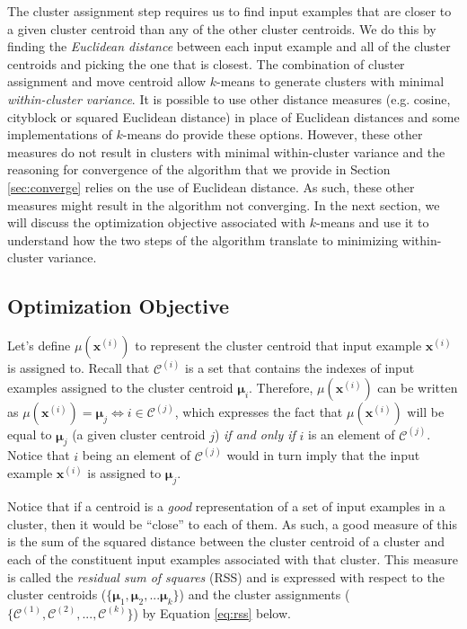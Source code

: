 The cluster assignment step requires us to find input examples that are closer to a given cluster centroid than any of the other cluster centroids. We do this by finding the \emph{Euclidean distance} between each input example and all of the cluster centroids and picking the one that is closest. The combination of cluster assignment and move centroid allow $k$-means to generate clusters with minimal \emph{within-cluster variance}. It is possible to use other distance measures (e.g. cosine, cityblock or squared Euclidean distance) in place of Euclidean distances and some implementations of $k$-means 
do provide these options. However, these other measures do not result in clusters with minimal within-cluster variance and the reasoning for convergence of the algorithm that we provide in Section \ref{sec:converge} relies on the use of Euclidean distance. As such, these other measures might result in the algorithm not converging.
In the next section, we will discuss the optimization objective associated with $k$-means and use it to understand how the two steps of the algorithm translate to minimizing within-cluster variance. 

\subsection{Optimization Objective}
\label{section:optimization-objective}

Let's define $\mu(\mathbf{x}^{(i)})$ to represent the cluster centroid that input example $\mathbf{x}^{(i)}$ is assigned to. Recall that $\mathcal{C}^{(i)}$ is a set that contains the indexes of input examples assigned to the cluster centroid $\boldsymbol{\mu}_i$. Therefore, $\mu(\mathbf{x}^{(i)})$ can be written as $\mu(\mathbf{x}^{(i)}) = \boldsymbol{\mu}_j \iff i \in \mathcal{C}^{(j)}$, which expresses the fact that $\mu(\mathbf{x}^{(i)})$ will be equal to $\boldsymbol{\mu}_j$ (a given cluster centroid $j$) \emph{if and only if} $i$ is an element of $\mathcal{C}^{(j)}$. Notice that $i$ being an element of $\mathcal{C}^{(j)}$ would in turn imply that the input example $\mathbf{x}^{(i)}$ is assigned to $\boldsymbol{\mu}_j$. 

Notice that if a centroid is a \emph{good} representation of a set of input examples in a cluster, then it would be ``close'' to each of them. As such, a good measure of this is the sum of the squared distance between the cluster centroid of a cluster and each of the constituent input examples associated with that cluster. This measure is called the \emph{residual sum of squares} (RSS) and is expressed with respect to the cluster centroids ($\{ \boldsymbol{\mu}_1, \boldsymbol{\mu}_2, ... \boldsymbol{\mu}_k\}$) and the cluster assignments ($\{\mathcal{C}^{(1)}, \mathcal{C}^{(2)}, ..., \mathcal{C}^{(k)}\}$) by Equation \ref{eq:rss} below.

